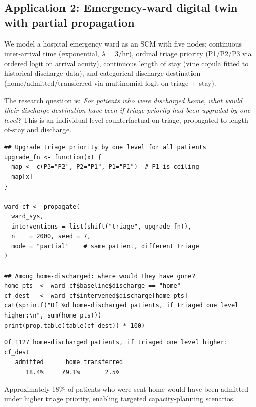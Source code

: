\documentclass[article]{jss}
\begin{document}
\subsection{Application 2: Emergency-ward digital twin with partial propagation}
\label{sec:app_ward}

We model a hospital emergency ward as an SCM with five nodes: continuous
inter-arrival time (exponential, $\lambda = 3/\text{hr}$), ordinal triage
priority (P1/P2/P3 via ordered logit on arrival acuity), continuous length of
stay (vine copula fitted to historical discharge data), and categorical discharge
destination (home/admitted/transferred via multinomial logit on triage + stay).

The research question is: \emph{For patients who were discharged home, what would
their discharge destination have been if triage priority had been upgraded by one
level?} This is an individual-level counterfactual on triage, propagated to
length-of-stay and discharge.

\begin{tcolorbox}[codebox, title={\small\textbf{R} code --- triage counterfactual}]
\begin{verbatim}
## Upgrade triage priority by one level for all patients
upgrade_fn <- function(x) {
  map <- c(P3="P2", P2="P1", P1="P1")  # P1 is ceiling
  map[x]
}

ward_cf <- propagate(
  ward_sys,
  interventions = list(shift("triage", upgrade_fn)),
  n    = 2000, seed = 7,
  mode = "partial"    # same patient, different triage
)

## Among home-discharged: where would they have gone?
home_pts  <- ward_cf$baseline$discharge == "home"
cf_dest   <- ward_cf$intervened$discharge[home_pts]
cat(sprintf("Of %d home-discharged patients, if triaged one level higher:\n", sum(home_pts)))
print(prop.table(table(cf_dest)) * 100)
\end{verbatim}
\end{tcolorbox}

\begin{tcolorbox}[outputbox, title={\small Output}]
\begin{verbatim}
Of 1127 home-discharged patients, if triaged one level higher:
cf_dest
   admitted      home transferred
      18.4%     79.1%       2.5%
\end{verbatim}
\end{tcolorbox}

Approximately 18\% of patients who were sent home would have been admitted under
higher triage priority, enabling targeted capacity-planning scenarios.
\end{document}
